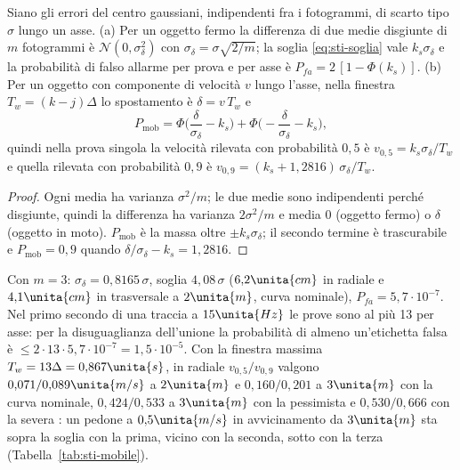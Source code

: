 \begin{proposizione}\label{prop:sti-mobile}
Siano gli errori del centro gaussiani, indipendenti fra i fotogrammi, di scarto tipo $\sigma$ lungo un asse. (a) Per un oggetto fermo la differenza di due medie disgiunte di $m$ fotogrammi è $\mathcal N(0,\sigma_\delta^2)$ con $\sigma_\delta=\sigma\sqrt{2/m}$; la soglia \eqref{eq:sti-soglia} vale $k_s\sigma_\delta$ e la probabilità di falso allarme per prova e per asse è $P_{fa}=2\,[1-\Phi(k_s)]$. (b) Per un oggetto con componente di velocità $v$ lungo l'asse, nella finestra $T_w=(k-j)\Delta$ lo spostamento è $\delta=v\,T_w$ e
\[P_{\mathrm{mob}}=\Phi\!\Big(\frac{\delta}{\sigma_\delta}-k_s\Big)+\Phi\!\Big(-\frac{\delta}{\sigma_\delta}-k_s\Big),\]
quindi nella prova singola la velocità rilevata con probabilità $0{,}5$ è $v_{0,5}=k_s\sigma_\delta/T_w$ e quella rilevata con probabilità $0{,}9$ è $v_{0,9}=(k_s+1{,}2816)\,\sigma_\delta/T_w$. 
\end{proposizione}
\begin{proof}
Ogni media ha varianza $\sigma^2/m$; le due medie sono indipendenti perché disgiunte, quindi la differenza ha varianza $2\sigma^2/m$ e media $0$ (oggetto fermo) o $\delta$ (oggetto in moto). $P_{\mathrm{mob}}$ è la massa oltre $\pm k_s\sigma_\delta$; il secondo termine è trascurabile e $P_{\mathrm{mob}}=0{,}9$ quando $\delta/\sigma_\delta-k_s=1{,}2816$.
\end{proof}
Con $m=3$: $\sigma_\delta=0{,}8165\,\sigma$, soglia $4{,}08\,\sigma$ ($6{,}2\unita{cm}$ in radiale e $4{,}1\unita{cm}$ in trasversale a $2\unita{m}$, curva nominale), $P_{fa}=5{,}7\cdot10^{-7}$. Nel primo secondo di una traccia a $15\unita{Hz}$ le prove sono al più 13 per asse: per la disuguaglianza dell'unione la probabilità di almeno un'etichetta falsa è $\le2\cdot13\cdot5{,}7\cdot10^{-7}=1{,}5\cdot10^{-5}$. Con la finestra massima $T_w=13\Delta=0{,}867\unita{s}$, in radiale $v_{0,5}/v_{0,9}$ valgono $0{,}071/0{,}089\unita{m/s}$ a $2\unita{m}$ e $0{,}160/0{,}201$ a $3\unita{m}$ con la curva nominale, $0{,}424/0{,}533$ a $3\unita{m}$ con la pessimista e $0{,}530/0{,}666$ con la severa : un pedone a $0{,}5\unita{m/s}$ in avvicinamento da $3\unita{m}$ sta sopra la soglia con la prima, vicino con la seconda, sotto con la terza (Tabella~\ref{tab:sti-mobile}).

